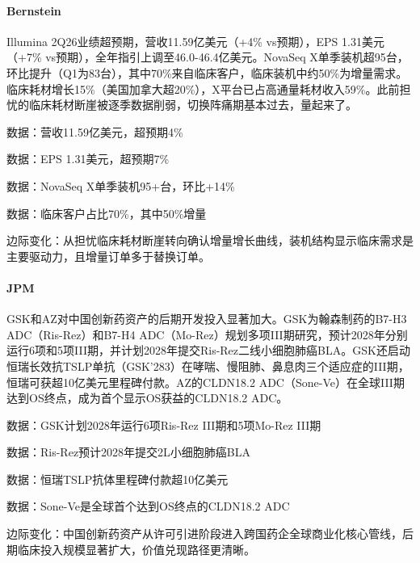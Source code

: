 \documentclass[11pt]{ctexart}
\begin{document}
\paragraph{Bernstein} Illumina 2Q26业绩超预期，营收11.59亿美元（+4\% vs预期），EPS 1.31美元（+7\% vs预期），全年指引上调至46.0-46.4亿美元。NovaSeq X单季装机超95台，环比提升（Q1为83台），其中70\%来自临床客户，临床装机中约50\%为增量需求。临床耗材增长15\%（美国加拿大超20\%），X平台已占高通量耗材收入59\%。此前担忧的临床耗材断崖被逐季数据削弱，切换阵痛期基本过去，量起来了。
{\small\color{refgray}数据：营收11.59亿美元，超预期4\%\par}
{\small\color{refgray}数据：EPS 1.31美元，超预期7\%\par}
{\small\color{refgray}数据：NovaSeq X单季装机95+台，环比+14\%\par}
{\small\color{refgray}数据：临床客户占比70\%，其中50\%增量\par}
{\small\color{refgray}边际变化：从担忧临床耗材断崖转向确认增量增长曲线，装机结构显示临床需求是主要驱动力，且增量订单多于替换订单。\par}
\paragraph{JPM} GSK和AZ对中国创新药资产的后期开发投入显著加大。GSK为翰森制药的B7-H3 ADC（Ris-Rez）和B7-H4 ADC（Mo-Rez）规划多项III期研究，预计2028年分别运行6项和5项III期，并计划2028年提交Ris-Rez二线小细胞肺癌BLA。GSK还启动恒瑞长效抗TSLP单抗（GSK'283）在哮喘、慢阻肺、鼻息肉三个适应症的III期，恒瑞可获超10亿美元里程碑付款。AZ的CLDN18.2 ADC（Sone-Ve）在全球III期达到OS终点，成为首个显示OS获益的CLDN18.2 ADC。
{\small\color{refgray}数据：GSK计划2028年运行6项Ris-Rez III期和5项Mo-Rez III期\par}
{\small\color{refgray}数据：Ris-Rez预计2028年提交2L小细胞肺癌BLA\par}
{\small\color{refgray}数据：恒瑞TSLP抗体里程碑付款超10亿美元\par}
{\small\color{refgray}数据：Sone-Ve是全球首个达到OS终点的CLDN18.2 ADC\par}
{\small\color{refgray}边际变化：中国创新药资产从许可引进阶段进入跨国药企全球商业化核心管线，后期临床投入规模显著扩大，价值兑现路径更清晰。\par}
\end{document}
